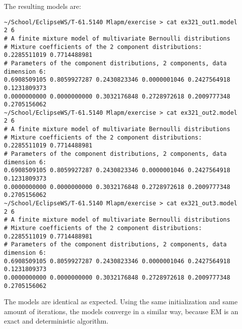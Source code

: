 \documentclass[a4paper,oneside,article]{memoir}
\begin{document}
The resulting models are:
\begin{lstlisting}
~/School/EclipseWS/T-61.5140 Mlapm/exercise > cat ex321_out1.model 
2 6
# A finite mixture model of multivariate Bernoulli distributions
# Mixture coefficients of the 2 component distributions:
0.2285511019 0.7714488981 
# Parameters of the component distributions, 2 components, data dimension 6:
0.6908509105 0.8059927287 0.2430823346 0.0000001046 0.2427564918 0.1231809373 
0.0000000000 0.0000000000 0.3032176848 0.2728972618 0.2009777348 0.2705156062 
~/School/EclipseWS/T-61.5140 Mlapm/exercise > cat ex321_out2.model 
2 6
# A finite mixture model of multivariate Bernoulli distributions
# Mixture coefficients of the 2 component distributions:
0.2285511019 0.7714488981 
# Parameters of the component distributions, 2 components, data dimension 6:
0.6908509105 0.8059927287 0.2430823346 0.0000001046 0.2427564918 0.1231809373 
0.0000000000 0.0000000000 0.3032176848 0.2728972618 0.2009777348 0.2705156062 
~/School/EclipseWS/T-61.5140 Mlapm/exercise > cat ex321_out3.model 
2 6
# A finite mixture model of multivariate Bernoulli distributions
# Mixture coefficients of the 2 component distributions:
0.2285511019 0.7714488981 
# Parameters of the component distributions, 2 components, data dimension 6:
0.6908509105 0.8059927287 0.2430823346 0.0000001046 0.2427564918 0.1231809373 
0.0000000000 0.0000000000 0.3032176848 0.2728972618 0.2009777348 0.2705156062 
\end{lstlisting}
The models are identical as expected. Using the same initialization and same amount of iterations, the models converge in a similar way, because EM is an exact and deterministic algorithm.
\end{document}
